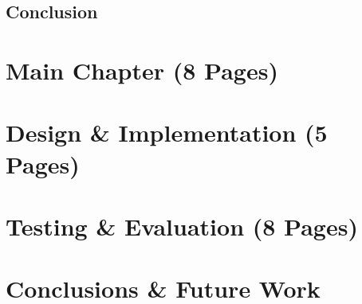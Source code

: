 \documentclass[]{final_report}
\begin{document}
\section{Conclusion}

\chapter{Main Chapter (8 Pages)}

\chapter{Design \& Implementation (5 Pages)}

\chapter{Testing \& Evaluation (8 Pages)}

\chapter{Conclusions \& Future Work}
\end{document}
